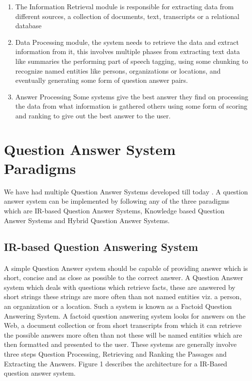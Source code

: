 \begin{enumerate}
\item The Information Retrieval module is responsible for extracting data from different sources, a collection of documents, text, transcripts or a relational database
\item Data Processing module, the system needs to retrieve the data and extract information from it, this involves multiple phases from extracting text data like summaries the performing part of speech tagging, using some chunking to recognize named entities like persons, organizations or locations, and eventually generating some form of question answer pairs.
\item Answer Processing Some systems give the best answer they find on processing the data from what information is gathered others using some form of scoring and ranking to give out the best answer to the user.
\end{enumerate}

\section{Question Answer System Paradigms}
We have had multiple Question Answer Systems developed till today \cite {katz1997annotating} \cite {zheng2002answerbus}.
A question answer system can be implemented by following any of the three paradigms \cite {wongso2016literature} which are IR-based Question Answer Systems, Knowledge based Question Answer Systems and Hybrid Question Answer Systems.

\subsection{IR-based Question Answering System}
\paragraph{}
A simple Question Answer system should be capable of providing answer which is short, concise and as close as possible to the correct answer. A Question Answer system which deals with questions which retrieve facts, these are answered by short strings these strings are more often than not named entities viz. a person, an organization or a location. Such a system is known as a Factoid Question Answering System. A factoid question answering system looks for answers on the Web, a document collection or from short transcripts from which it can retrieve the possible answers more often than not these will be named entities \cite {chopra2016named} which are then formatted and presented to the user. These systems are generally involve three steps Question Processing, Retrieving and Ranking the Passages and Extracting the Answers. Figure 1 describes the architecture for a IR-Based question answer system.

